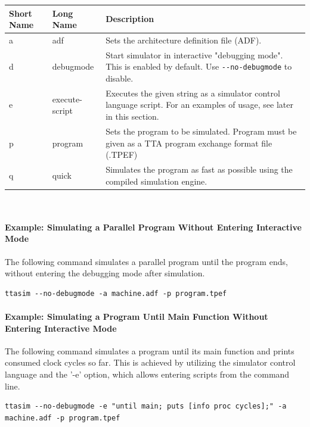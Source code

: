 \documentclass[twoside]{tceusermanual}
\begin{document}
\begin{tabular}{p{}p{}
                p{}}
\textbf{Short Name} &\textbf{Long Name} &\textbf{Description} \\
\hline
a & adf & Sets the architecture definition file (ADF). \\
d & debugmode & Start simulator in interactive "debugging mode". This is enabled by default. Use \verb|--no-debugmode| to disable.\\
e & execute-script & Executes the given string as a simulator control language script. For an examples of usage, see later in this section. \\
p & program & Sets the program to be simulated. Program must be given as a TTA program exchange format file (.TPEF) \\
q & quick & Simulates the program as fast as possible using the compiled simulation engine. \\
\end{tabular}\\



\paragraph{Example: Simulating a Parallel Program Without Entering Interactive
Mode}

The following command simulates a parallel program until the program ends,
without entering the debugging mode after simulation.

\begin{verbatim}
ttasim --no-debugmode -a machine.adf -p program.tpef
\end{verbatim}

\paragraph{Example: Simulating a Program Until Main Function Without
Entering Interactive Mode}

The following command simulates a program until its main function and
prints consumed clock cycles so far. This is achieved by utilizing the simulator
control language and the '-e' option, which allows entering scripts 
from the command line.

\begin{verbatim}
ttasim --no-debugmode -e "until main; puts [info proc cycles];" -a machine.adf -p program.tpef
\end{verbatim}
\end{document}
